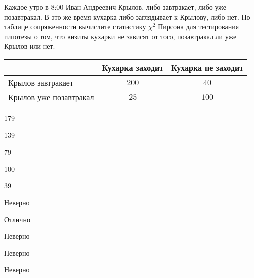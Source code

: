 
\begin{question}
Каждое утро в 8:00 Иван Андреевич Крылов, либо завтракает, либо уже
позавтракал. В это же время кухарка либо заглядывает к Крылову, либо
нет. По таблице сопряженности вычислите статистику \(\chi^2\) Пирсона
для тестирования гипотезы о том, что визиты кухарки не зависят от того,
позавтракал ли уже Крылов или нет.

\begin{tabular}{@{}l|cc@{}}
\toprule
                       & Кухарка заходит & Кухарка не заходит \\ \midrule
Крылов завтракает      & $200$           & $40$               \\
Крылов уже позавтракал & $25$            & $100$              \\ \bottomrule
\end{tabular}
\begin{answerlist}
  \item 179
  \item 139
  \item 79
  \item 100
  \item 39
\end{answerlist}
\end{question}

\begin{solution}
\begin{answerlist}
  \item Неверно
  \item Отлично
  \item Неверно
  \item Неверно
  \item Неверно
\end{answerlist}
\end{solution}

